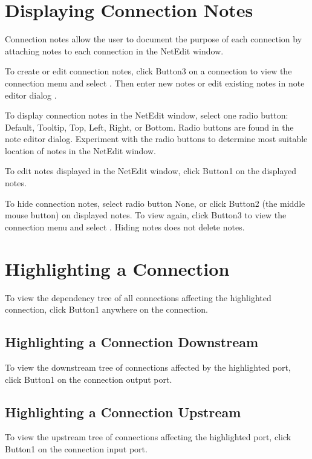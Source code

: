 \section{Displaying Connection Notes}
\label{sec:displaynotes}

Connection notes allow the user to document the purpose of
each connection by attaching notes to each connection in the NetEdit window.

To create or edit connection notes, click Button3 on a connection to
view the connection menu and select . Then enter new
notes or edit existing notes in note editor dialog .

To display connection notes in the NetEdit window, select one radio
button: Default, Tooltip, Top, Left, Right, or Bottom. Radio buttons
are found in the note editor dialog.  Experiment with
the radio buttons to determine most suitable location of
notes in the NetEdit window.

To edit notes displayed in the NetEdit window, click Button1 on the
displayed notes.

To hide connection notes, select radio button None, or click Button2 (the
middle mouse button) on displayed notes. To view again, click Button3 to
view the connection menu and select . Hiding notes does
not delete notes.


\section{Highlighting a Connection}
\label{sec:highlightconnect}

To view the dependency tree of all connections affecting the
highlighted connection, click Button1 anywhere on the connection.

\subsection{Highlighting a Connection Downstream}

To view the downstream tree of connections affected by the
highlighted port, click Button1 on the connection output port.

\subsection{Highlighting a Connection Upstream}

To view the upstream tree of connections affecting the highlighted
port, click Button1 on the connection input port.

